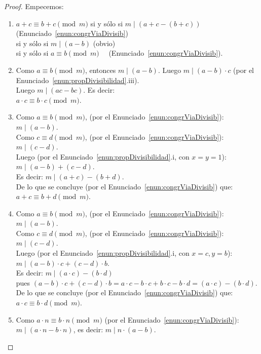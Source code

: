 \begin{proof} Empecemos:
\begin{enumerate}[label=\roman*)]
\item $a+c \equiv b+c \pmod  m$ si y sólo si $m \mid (a+c-(b+c))$ (Enunciado~\ref{enun:congrViaDivisib}) \\
si y sólo si $m \mid (a-b)$  \quad\quad\quad (obvio)\\
si y sólo si $a \equiv b \pmod  m \quad$ (Enunciado~\ref{enun:congrViaDivisib}).
\item Como $a \equiv b \pmod  m$, entonces $m \mid (a-b)$.
Luego $m \mid (a-b) \cdot c$ (por el Enunciado~\ref{enun:propDivisibilidad}.iii).\\
Luego $m \mid (ac-bc)$. Es decir:\\
$a \cdot c \equiv b \cdot c \pmod m$.
\item Como $a \equiv b \pmod  m$, (por el Enunciado~\ref{enun:congrViaDivisib}): $m \mid (a-b)$. \\
Como $c \equiv d \pmod  m$, (por el Enunciado~\ref{enun:congrViaDivisib}): $m \mid (c-d)$.\\
Luego (por el Enunciado~\ref{enun:propDivisibilidad}.i, con $x=y=1$): $m \mid (a-b)+(c-d)$.\\
Es decir: $m \mid (a+c)-(b+d)$.\\
De lo que se concluye (por el Enunciado~\ref{enun:congrViaDivisib}) que:\\
$a+c \equiv b+d \pmod m$.
\item Como $a \equiv b \pmod  m$, (por el Enunciado~\ref{enun:congrViaDivisib}): $m \mid (a-b)$. \\
Como $c \equiv d \pmod  m$, (por el Enunciado~\ref{enun:congrViaDivisib}): $m \mid (c-d)$.\\
Luego (por el Enunciado~\ref{enun:propDivisibilidad}.i, con $x=c, y=b$): $m \mid (a-b) \cdot c+(c-d) \cdot b$.\\
Es decir: $m \mid (a \cdot c)-(b \cdot d)$ \\
pues $(a-b) \cdot c+(c-d) \cdot b=a \cdot c - b \cdot c + b \cdot c - b \cdot d=(a \cdot c)-(b \cdot d)$.\\
De lo que se concluye (por el Enunciado~\ref{enun:congrViaDivisib}) que:\\
$a \cdot c \equiv b \cdot d \pmod m$.
\item Como $a \cdot n \equiv b \cdot n \pmod  m$ (por el Enunciado~\ref{enun:congrViaDivisib}):\\
$m \mid (a \cdot n-b \cdot n)$, es decir: $m \mid  n \cdot(a-b)$.\\

\end{enumerate}
\end{proof}
